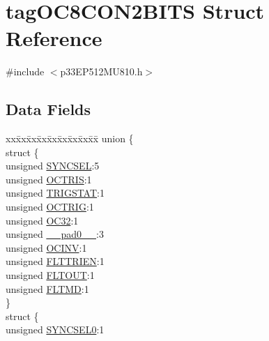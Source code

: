 \hypertarget{structtag_o_c8_c_o_n2_b_i_t_s}{}\section{tag\+O\+C8\+C\+O\+N2\+B\+I\+TS Struct Reference}
\label{structtag_o_c8_c_o_n2_b_i_t_s}


{\ttfamily \#include $<$p33\+E\+P512\+M\+U810.\+h$>$}

\subsection*{Data Fields}
\begin{DoxyCompactItemize}
\item 
\begin{tabbing}
xx\=xx\=xx\=xx\=xx\=xx\=xx\=xx\=xx\=\kill
union \{\\
\>struct \{\\
\>\>unsigned \hyperlink{structtag_o_c8_c_o_n2_b_i_t_s_a35fbbe11485c2615ed27535b62c3fa35}{SYNCSEL}:5\\
\>\>unsigned \hyperlink{structtag_o_c8_c_o_n2_b_i_t_s_ab849a74c6179282ed6b06cc047c80544}{OCTRIS}:1\\
\>\>unsigned \hyperlink{structtag_o_c8_c_o_n2_b_i_t_s_ab379549de54ac93ad4aa73686c34cb7c}{TRIGSTAT}:1\\
\>\>unsigned \hyperlink{structtag_o_c8_c_o_n2_b_i_t_s_a8d2cf9b996ef2b9079defa8950de798c}{OCTRIG}:1\\
\>\>unsigned \hyperlink{structtag_o_c8_c_o_n2_b_i_t_s_af52e127483a703e0fa84c7d4f1de0df4}{OC32}:1\\
\>\>unsigned \hyperlink{structtag_o_c8_c_o_n2_b_i_t_s_adf71f3d8410c1f1dbbc96680a92c49af}{\_\_pad0\_\_}:3\\
\>\>unsigned \hyperlink{structtag_o_c8_c_o_n2_b_i_t_s_a301004fca40c8d19d418866c92c19a06}{OCINV}:1\\
\>\>unsigned \hyperlink{structtag_o_c8_c_o_n2_b_i_t_s_ab979b75e02643aa840fb6ee50e0c30fa}{FLTTRIEN}:1\\
\>\>unsigned \hyperlink{structtag_o_c8_c_o_n2_b_i_t_s_ae466664b094d9c830e9ce20b86d7907f}{FLTOUT}:1\\
\>\>unsigned \hyperlink{structtag_o_c8_c_o_n2_b_i_t_s_a245ca3019d6c6ccbfb09f1c821146bb5}{FLTMD}:1\\
\>\} \\
\>struct \{\\
\>\>unsigned \hyperlink{structtag_o_c8_c_o_n2_b_i_t_s_a3b5df3154fde5141e6ac0156425ff8b4}{SYNCSEL0}:1\\

\end{tabbing}
\end{DoxyCompactItemize}
